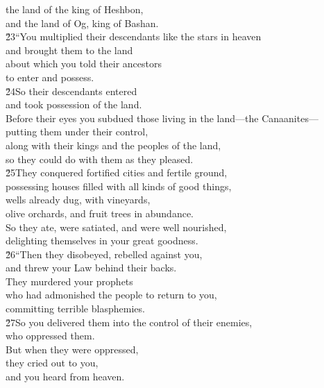 \begin{poetry}
\poemll    the land of the king of Heshbon, \\
\poemlll       and the land of Og, king of Bashan. \\
\poeml \v{23}``You multiplied their descendants like the stars in heaven \\
\poemll    and brought them to the land \\
\poeml about which you told their ancestors \\
\poemll    to enter and possess. \\
\poeml \v{24}So their descendants entered \\
\poemll    and took possession of the land. \\
\poeml Before their eyes you subdued those living in the land---the Canaanites--- \\
\poemll    putting them under their control, \\
\poeml along with their kings and the peoples of the land, \\
\poemll    so they could do with them as they pleased. \\
\poeml \v{25}They conquered fortified cities and fertile ground, \\
\poemll    possessing houses filled with all kinds of good things, \\
\poeml wells already dug, with vineyards, \\
\poemll    olive orchards, and fruit trees in abundance. \\
\poeml So they ate, were satiated, and were well nourished, \\
\poemll    delighting themselves in your great goodness. \\
\poeml \v{26}``Then they disobeyed, rebelled against you, \\
\poemll    and threw your Law behind their backs. \\
\poeml They murdered your prophets \\
\poemll    who had admonished the people to return to you, \\
\poemlll       committing terrible blasphemies. \\
\poeml \v{27}So you delivered them into the control of their enemies, \\
\poemll    who oppressed them. \\
\poeml But when they were oppressed, \\
\poemll    they cried out to you, \\
\poemlll       and you heard from heaven. \\

\end{poetry}
